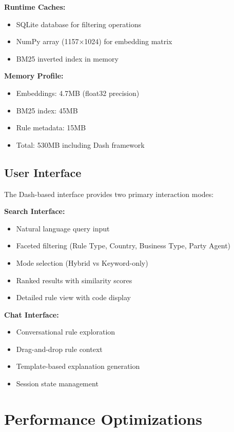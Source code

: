 \textbf{Runtime Caches:}
\begin{itemize}[leftmargin=*,itemsep=2pt,topsep=2pt]
  \item SQLite database for filtering operations
  \item NumPy array (1157×1024) for embedding matrix
  \item BM25 inverted index in memory
\end{itemize}

\textbf{Memory Profile:}
\begin{itemize}[leftmargin=*,itemsep=2pt,topsep=2pt]
  \item Embeddings: 4.7MB (float32 precision)
  \item BM25 index: 45MB
  \item Rule metadata: 15MB
  \item Total: 530MB including Dash framework
\end{itemize}

\subsection{User Interface}

The Dash-based interface provides two primary interaction modes:

\textbf{Search Interface:}
\begin{itemize}[leftmargin=*,itemsep=2pt,topsep=2pt]
  \item Natural language query input
  \item Faceted filtering (Rule Type, Country, Business Type, Party Agent)
  \item Mode selection (Hybrid vs Keyword-only)
  \item Ranked results with similarity scores
  \item Detailed rule view with code display
\end{itemize}

\textbf{Chat Interface:}
\begin{itemize}[leftmargin=*,itemsep=2pt,topsep=2pt]
  \item Conversational rule exploration
  \item Drag-and-drop rule context
  \item Template-based explanation generation
  \item Session state management
\end{itemize}

\section{Performance Optimizations}

